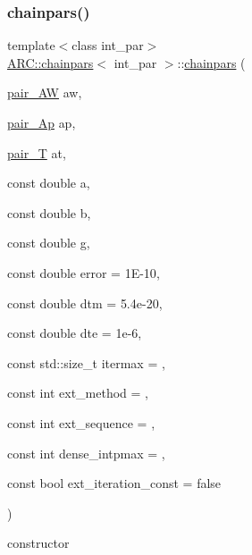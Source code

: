 \subsubsection{\texorpdfstring{chainpars()}{chainpars()}\hspace{0.1cm}{\footnotesize\ttfamily [2/2]}}
{\footnotesize\ttfamily template$<$class int\+\_\+par$>$ \\
\hyperlink{classARC_1_1chainpars}{A\+R\+C\+::chainpars}$<$ int\+\_\+par $>$\+::\hyperlink{classARC_1_1chainpars}{chainpars} (\begin{DoxyParamCaption}\item[{\hyperlink{classARC_1_1chainpars_a9558124278a55c0301642e1df63be063}{pair\+\_\+\+AW}}]{aw,  }\item[{\hyperlink{classARC_1_1chainpars_a80fcc6e3b5ce69025126bc49d90f233c}{pair\+\_\+\+Ap}}]{ap,  }\item[{\hyperlink{classARC_1_1chainpars_a860194e916f3ae900e93beedd277fa3c}{pair\+\_\+T}}]{at,  }\item[{const double}]{a,  }\item[{const double}]{b,  }\item[{const double}]{g,  }\item[{const double}]{error = {\ttfamily 1E-\/10},  }\item[{const double}]{dtm = {\ttfamily 5.4e-\/20},  }\item[{const double}]{dte = {\ttfamily 1e-\/6},  }\item[{const std\+::size\+\_\+t}]{itermax = {},  }\item[{const int}]{ext\+\_\+method = {},  }\item[{const int}]{ext\+\_\+sequence = {},  }\item[{const int}]{dense\+\_\+intpmax = {},  }\item[{const bool}]{ext\+\_\+iteration\+\_\+const = {\ttfamily false} }\end{DoxyParamCaption})\hspace{0.3cm}{\ttfamily [inline]}}



constructor 

